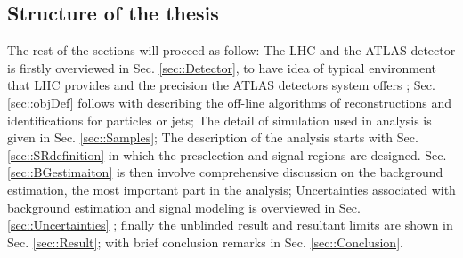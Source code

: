 \subsection{Structure of the thesis}
The rest of the sections will proceed as follow: 
The LHC and the ATLAS detector is firstly overviewed in Sec. \ref{sec::Detector}, 
to have idea of typical environment that LHC provides and 
the precision the ATLAS detectors system offers ; 
Sec. \ref{sec::objDef} follows with describing the off-line algorithms of reconstructions and identifications for particles or jets; 
The detail of simulation used in analysis is given in Sec. \ref{sec::Samples}; 
The description of the analysis starts with Sec. \ref{sec::SRdefinition} in which the preselection and signal regions are designed. Sec. \ref{sec::BGestimaiton} is then involve comprehensive discussion on the background estimation, the most important part in the analysis;
Uncertainties associated with background estimation and signal modeling is overviewed in Sec. \ref{sec::Uncertainties}
; finally the unblinded result and resultant limits are shown in Sec. \ref{sec::Result}; 
with brief conclusion remarks in Sec. \ref{sec::Conclusion}.


